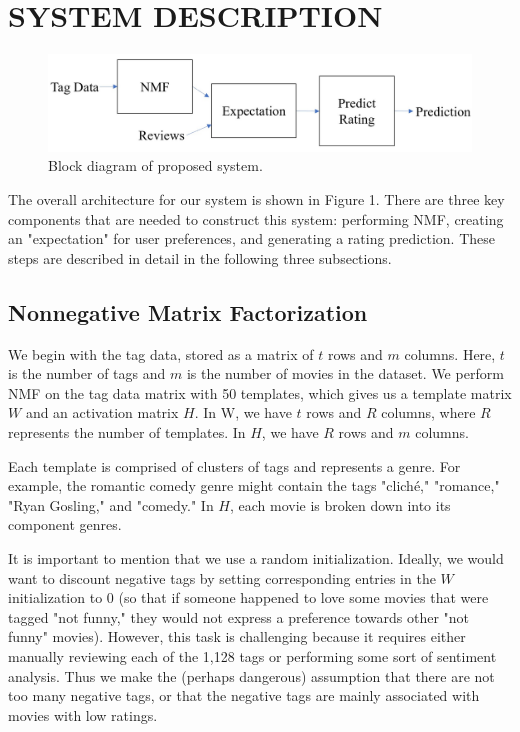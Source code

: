 \documentclass[letterpaper, 10 pt, conference]{ieeeconf}  %
\begin{document}
\medbreak
\section{SYSTEM DESCRIPTION}

\begin{figure}[h]
   \includegraphics[scale=0.5]{./figs/blockdiagram.jpg}
   \caption{Block diagram of proposed system.}
\end{figure}

The overall architecture for our system is shown in Figure 1. There are three key components that are needed to construct this system: performing NMF, creating an "expectation" for user preferences, and generating a rating prediction. These steps are described in detail in the following three subsections.

\smallbreak
\subsection{Nonnegative Matrix Factorization}

We begin with the tag data, stored as a matrix of $t$ rows and $m$ columns. Here, $t$ is the number of tags and $m$ is the number of movies in the dataset.
We perform NMF on the tag data matrix with 50 templates, which gives us a template matrix $W$ and an activation matrix $H$.
In W, we have $t$ rows and $R$ columns, where $R$ represents the number of templates. In $H$, we have $R$ rows and $m$ columns. 

Each template is comprised of clusters of tags and represents a genre. For example, the romantic comedy genre might contain the tags "cliché," "romance," "Ryan Gosling," and "comedy." In $H$, each movie is broken down into its component genres.

It is important to mention that we use a random initialization. Ideally, we would want to discount negative tags by setting corresponding entries in the $W$ initialization to 0 (so that if someone happened to love some movies that were tagged "not funny," they would not express a preference towards other "not funny" movies). However, this task is challenging because it requires either manually reviewing each of the 1,128 tags or performing some sort of sentiment analysis. Thus we make the (perhaps dangerous) assumption that there are not too many negative tags, or that the negative tags are mainly associated with movies with low ratings.
\end{document}
